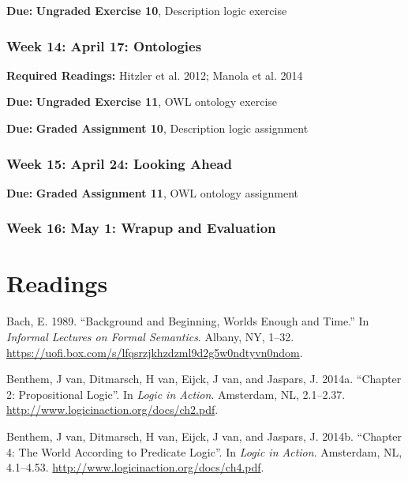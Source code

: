 \documentclass[]{article}
\begin{document}
\textbf{Due:} \textbf{Ungraded Exercise 10}, Description logic exercise

\subsubsection{Week 14: April 17:
Ontologies}\label{week-14-april-17-ontologies}

\textbf{Required Readings:} Hitzler et al. 2012; Manola et al. 2014

\textbf{Due:} \textbf{Ungraded Exercise 11}, OWL ontology exercise

\textbf{Due:} \textbf{Graded Assignment 10}, Description logic
assignment

\subsubsection{Week 15: April 24: Looking
Ahead}\label{week-15-april-24-looking-ahead}

\textbf{Due:} \textbf{Graded Assignment 11}, OWL ontology assignment

\subsubsection{Week 16: May 1: Wrapup and
Evaluation}\label{week-16-may-1-wrapup-and-evaluation}

\section*{Readings}\label{readings}

\hypertarget{refs}{}
\hypertarget{ref-bachux5fbackgroundux5f1989}{}
Bach, E. 1989. ``Background and Beginning, Worlds Enough and Time.'' In
\emph{Informal Lectures on Formal Semantics}. Albany, NY, 1--32.
\url{https://uofi.box.com/s/lfqsrzjkhzdzml9d2g5w0ndtyvn0ndom}.

\hypertarget{ref-vanux5fbenthemux5fchapterux5f2014}{}
Benthem, J van, Ditmarsch, H van, Eijck, J van, and Jaspars, J. 2014a.
``Chapter 2: Propositional Logic''. In \emph{Logic in Action}.
Amsterdam, NL, 2.1--2.37.
\url{http://www.logicinaction.org/docs/ch2.pdf}.

\hypertarget{ref-vanux5fbenthemux5fchapterux5f2014-1}{}
Benthem, J van, Ditmarsch, H van, Eijck, J van, and Jaspars, J. 2014b.
``Chapter 4: The World According to Predicate Logic''. In \emph{Logic in
Action}. Amsterdam, NL, 4.1--4.53.
\url{http://www.logicinaction.org/docs/ch4.pdf}.
\end{document}
